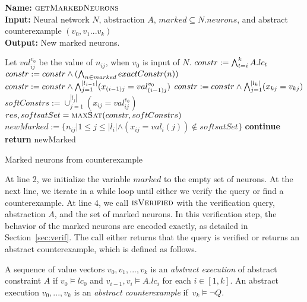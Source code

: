 \begin{algorithm}[t]
  \textbf{Name: } $\textsc{getMarkedNeurons}$ \\
  \textbf{Input: } Neural network $N$, \deeppoly{} abstraction $A$, $marked\subseteq N.neurons$, and abstract counterexample $({v_0}, {v_1} ... {v_k})$\\
  \textbf{Output: } New marked neurons. 
  \begin{algorithmic}[1]
    \State Let ${val^{v_0}_{ij}}$ be the value of $n_{ij}$, when ${v_0}$ is input of $N$. 
     
        \State $constr := \bigwedge_{t=i}^k A.lc_t$
        \State $constr := constr \land (\bigwedge_{n \in marked} exactConstr(n))$ 
        \State $constr := constr \land \bigwedge_{j=1}^{|l_{i-1}|} (x_{(i-1)j} = val^{v_0}_{(i-1)j})$
        \State $constr := constr \land \bigwedge_{j=1}^{|l_k|} (x_{kj} = v_{kj})$
        \State $softConstrs := \cup_{j=1}^{|l_j|} (x_{ij} = val^{v_0}_{ij})$
        \State $res, softsatSet = \textsc{maxSat}{}(constr, softConstrs)$ 
        \State $newMarked := \{n_{ij} | 1 \leq j \leq |l_i| \land (x_{ij} = val_i(j)) \notin  softsatSet\}$ 
          \State \textbf{continue}
        \Else
          \State \textbf{return} newMarked
        \EndIf 
      \EndIf
    \EndFor
  \end{algorithmic}
  \caption{Marked neurons from counterexample}
  \label{algo:refine2}
\end{algorithm}

  
At line 2, we initialize the variable $marked$ to the empty set of neurons.  At the next line, we iterate in a while loop until either we verify the query or find a counterexample. At line 4, we call $\textsc{isVerified}$ with the verification query, abstraction $A$, and the set of marked neurons. In this verification step, the behavior of the marked neurons are encoded exactly, as detailed in Section~\ref{sec:verif}. The call either returns that the query is verified or returns an abstract counterexample, which is defined as follows.

\begin{df}
  A sequence of value vectors ${v_0}, {v_1}, ... , {v_k}$ is an 
  {\em abstract execution} of abstract constraint $A$ if 
  ${v_0} \models lc_0$ and ${v_{i-1}}, {v_i} \models A.lc_i$ for each $i \in [1,k]$.  
  An abstract execution ${v_0,...,v_k}$ is
  an {\em abstract counterexample} if~${v_k} \models \lnot Q$.
\end{df}

